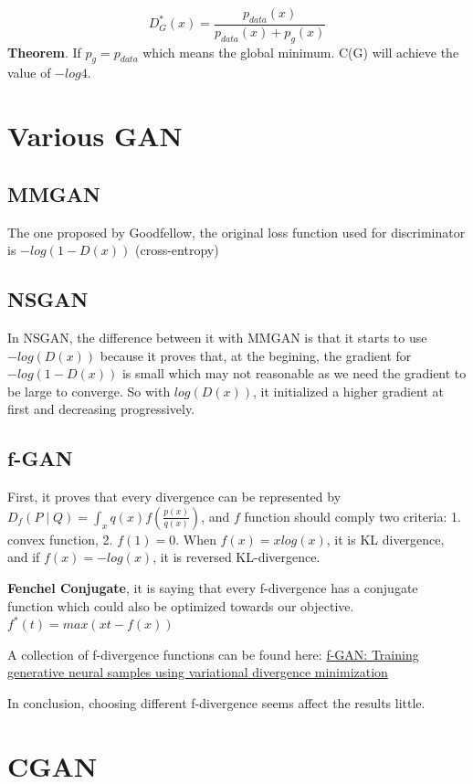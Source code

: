\documentclass{article}
\begin{document}
\begin{equation}
\label{1.1}
D^{*}_{G}(x)=\frac{p_{data}(x)}{p_{data}(x)+p_g(x)} 
\end{equation}
\textbf{Theorem}. If \(p_{g}=p_{data}\) which means the global minimum. C(G) will achieve the value of $-log4$.

\section{Various GAN}
\subsection{MMGAN}
The one proposed by Goodfellow, the original loss function used for
 discriminator is $-log(1- D(x))$ (cross-entropy)

\subsection{NSGAN}
In NSGAN, the difference between it with MMGAN is that it starts to use $-log(D(x))$ because it proves that, at the begining, the gradient for $-log(1-D(x))$ is small which may not reasonable as we need the gradient to be large to converge. So with $log(D(x))$, it initialized a higher gradient at first and decreasing progressively.

\subsection{f-GAN}
First, it proves that every divergence can be represented by $D_f(P \mid Q)=\int_xq(x)f(\frac{p(x)}{q(x)})$, and $f$ function should comply two criteria: 1. convex function, 2. $f(1)=0$. When $f(x)=xlog(x)$, it is KL divergence, and if $f(x)=-log(x)$, it is reversed KL-divergence.

\textbf{Fenchel Conjugate}, it is saying that every f-divergence has a conjugate function which could also be optimized towards our objective. $f^*(t)=max(xt-f(x))$

A collection of f-divergence functions can be found here: \href{https://arxiv.org/pdf/1606.00709.pdf}{f-GAN: Training generative neural samples using variational divergence minimization}

In conclusion, choosing different f-divergence seems affect the results little.

\section{CGAN}
\end{document}
